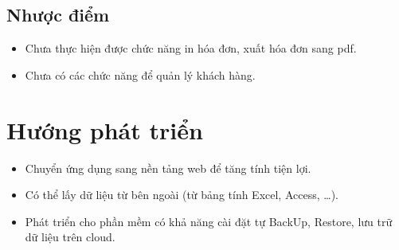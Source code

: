 \documentclass[12pt]{report}
\begin{document}
        \subsection{Nhược điểm}
            \begin{itemize}
                \item Chưa thực hiện được chức năng in hóa đơn, xuất hóa đơn sang pdf.
                \item Chưa có các chức năng để quản lý khách hàng.
            \end{itemize}
    \section{Hướng phát triển}
        \begin{itemize}
            \item Chuyển ứng dụng sang nền tảng web để tăng tính tiện lợi.
            \item Có thể lấy dữ liệu từ bên ngoài (từ bảng tính Excel, Access, …).
            \item Phát triển cho phần mềm có khả năng cài đặt tự BackUp, Restore, lưu trữ dữ liệu trên cloud.
        \end{itemize}
\end{document}

